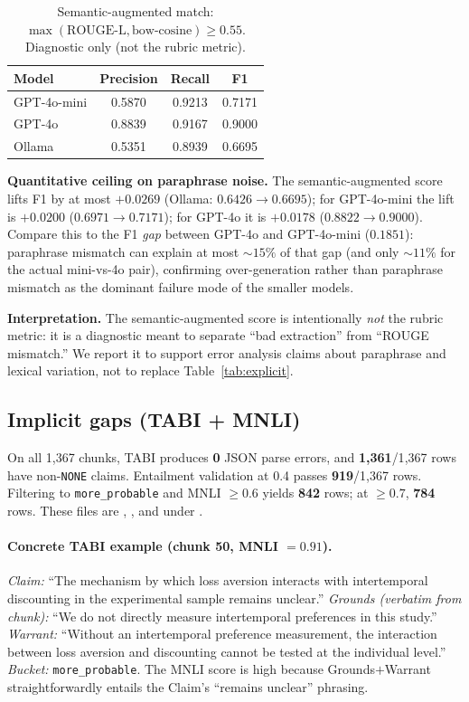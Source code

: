 \documentclass{article}
\begin{document}
\begin{table}[h]
\centering
\caption{Semantic-augmented match: $\max(\text{ROUGE-L},\text{bow-cosine}) \ge 0.55$. Diagnostic only (not the rubric metric).}
\label{tab:sem}
\begin{tabular}{lccc}
\toprule
Model & Precision & Recall & F1 \\
\midrule
GPT-4o-mini & 0.5870 & 0.9213 & 0.7171 \\
GPT-4o      & 0.8839 & 0.9167 & 0.9000 \\
Ollama      & 0.5351 & 0.8939 & 0.6695 \\
\bottomrule
\end{tabular}
\end{table}

\noindent\textbf{Quantitative ceiling on paraphrase noise.} The semantic-augmented score lifts F1 by at most $+0.0269$ (Ollama: $0.6426 \to 0.6695$); for GPT-4o-mini the lift is $+0.0200$ ($0.6971 \to 0.7171$); for GPT-4o it is $+0.0178$ ($0.8822 \to 0.9000$). Compare this to the F1 \emph{gap} between GPT-4o and GPT-4o-mini ($0.1851$): paraphrase mismatch can explain at most $\sim 15\%$ of that gap (and only $\sim 11\%$ for the actual mini-vs-4o pair), confirming over-generation rather than paraphrase mismatch as the dominant failure mode of the smaller models.

\noindent\textbf{Interpretation.} The semantic-augmented score is intentionally \emph{not} the rubric metric: it is a diagnostic meant to separate ``bad extraction'' from ``ROUGE mismatch.'' We report it to support error analysis claims about paraphrase and lexical variation, not to replace Table~\ref{tab:explicit}.

\subsection{Implicit gaps (TABI + MNLI)}\label{sec:results-implicit}
On all 1{,}367 chunks, TABI produces \textbf{0} JSON parse errors, and \textbf{1{,}361}/1{,}367 rows have non-\texttt{NONE} claims. Entailment validation at 0.4 passes \textbf{919}/1{,}367 rows. Filtering to \texttt{more\_probable} and MNLI $\ge 0.6$ yields \textbf{842} rows; at $\ge 0.7$, \textbf{784} rows. These files are , , and  under .

\paragraph{Concrete TABI example (chunk 50, MNLI $=0.91$).} \emph{Claim:} ``The mechanism by which loss aversion interacts with intertemporal discounting in the experimental sample remains unclear.'' \emph{Grounds (verbatim from chunk):} ``We do not directly measure intertemporal preferences in this study.'' \emph{Warrant:} ``Without an intertemporal preference measurement, the interaction between loss aversion and discounting cannot be tested at the individual level.'' \emph{Bucket:} \texttt{more\_probable}. The MNLI score is high because Grounds$+$Warrant straightforwardly entails the Claim's ``remains unclear'' phrasing.
\end{document}
